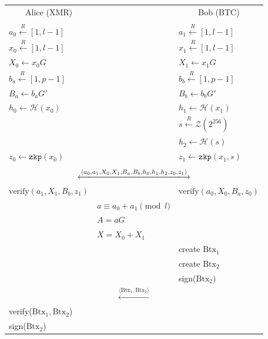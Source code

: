 \documentclass{llncs}
\renewcommand{\arraystretch}{1.5}
\begin{document}
\begin{figure}[H]
    \begin{table}[H]
      \centering
      \begin{scriptsize}
      {\renewcommand{\arraystretch}{1.2}%
      \begin{tabular}{ | l l l | }
        \hline
          \multicolumn{1}{|c}{Alice (XMR)} &  & \multicolumn{1}{c|}{Bob (BTC)} \\
          & & \\
          $a_0 \xleftarrow{R} [1, l-1]$ & & $a_1 \xleftarrow{R} [1, l-1]$ \\
          $x_0 \xleftarrow{R} [1, l-1]$ & & $x_1 \xleftarrow{R} [1, l-1]$ \\
          $X_0 \leftarrow x_0G$ & & $X_1 \leftarrow x_1G$ \\
          $b_a \xleftarrow{R} [1, p-1]$ & & $b_b \xleftarrow{R} [1, p-1]$ \\
          $B_a \leftarrow b_aG'$ & & $B_b \leftarrow b_bG'$ \\
          $h_0 \leftarrow \mathcal{H}(x_0)$ & & $h_1 \leftarrow \mathcal{H}(x_1)$ \\
          & & $s \xleftarrow{R} \mathcal{Z}(2^{256})$ \\
          & & $h_2 \leftarrow \mathcal{H}(s)$ \\
          $z_0 \leftarrow \texttt{zkp}(x_0)$ & & $z_1 \leftarrow \texttt{zkp}(x_1, s)$ \\
           & & \\
          \multicolumn{3}{|c|}{$\xlongleftrightarrow{\langle a_0, a_1, X_0, X_1, B_a, B_b, h_0, h_1, h_2, z_0, z_1 \rangle}$} \\
          $\text{verify}(a_1, X_1, B_b, z_1)$ & & $\text{verify}(a_0, X_0, B_a, z_0)$ \\
          & $a \equiv a_0 + a_1 \pmod l$ & \\
          & $A = aG$ & \\
          & $X = X_0 + X_1$ & \\
          & & create $\text{Btx}_1$ \\
          & & create $\text{Btx}_2$ \\
          & & sign($\text{Btx}_2$) \\
          \multicolumn{3}{|c|}{$\xleftarrow{\langle \text{Btx}_1, \text{Btx}_2 \rangle}$} \\
          verify($\text{Btx}_1, \text{Btx}_2$) & & \\
          sign($\text{Btx}_2$) & & \\

\end{tabular}}
\end{scriptsize}
\end{table}
\end{figure}
\end{document}
